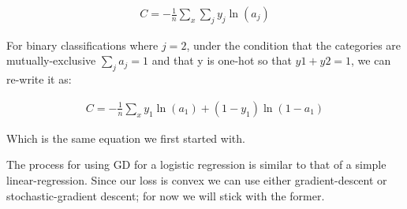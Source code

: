 \documentclass[]{book}
\newenvironment{Shaded}{\begin{snugshade}}{\end{snugshade}}
\newcommand{\CommentTok}[1]{\textcolor[rgb]{0.56,0.35,0.01}{\textit{#1}}}
\newcommand{\ControlFlowTok}[1]{\textcolor[rgb]{0.13,0.29,0.53}{\textbf{#1}}}
\newcommand{\DataTypeTok}[1]{\textcolor[rgb]{0.13,0.29,0.53}{#1}}
\newcommand{\DecValTok}[1]{\textcolor[rgb]{0.00,0.00,0.81}{#1}}
\newcommand{\FloatTok}[1]{\textcolor[rgb]{0.00,0.00,0.81}{#1}}
\newcommand{\KeywordTok}[1]{\textcolor[rgb]{0.13,0.29,0.53}{\textbf{#1}}}
\newcommand{\NormalTok}[1]{#1}
\newcommand{\OperatorTok}[1]{\textcolor[rgb]{0.81,0.36,0.00}{\textbf{#1}}}
\newcommand{\StringTok}[1]{\textcolor[rgb]{0.31,0.60,0.02}{#1}}
\begin{document}
\[\begin{aligned} 
   C = -\frac{1}{n}\sum_x\sum_j y_j\ln(a_j)
\end{aligned}\]

For binary classifications where \(j=2\), under the condition that the categories are mutually-exclusive \(\sum_ja_j=1\) and that y is one-hot so that \(y1+y2=1\), we can re-write it as:

\[\begin{aligned} 
   C = -\frac{1}{n}\sum_xy_1\ln(a_1) + (1 - y_1)\ln(1-a_1)
\end{aligned}\]

Which is the same equation we first started with.

The process for using GD for a logistic regression is similar to that of a simple linear-regression. Since our loss is convex we can use either gradient-descent or stochastic-gradient descent; for now we will stick with the former.

\begin{Shaded}
\end{Shaded}
\end{document}
